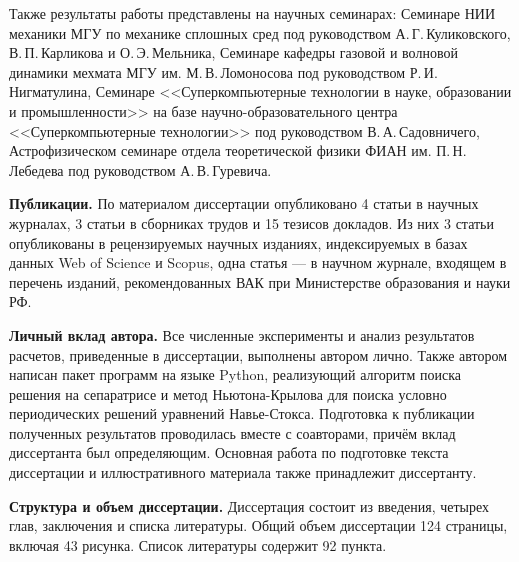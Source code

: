 Также результаты работы представлены на научных семинарах: 
Семинаре НИИ механики МГУ по механике сплошных сред под руководством А.\,Г.\,Куликовского, В.\,П.\,Карликова и О.\,Э.\,Мельника, 
Семинаре кафедры газовой и волновой динамики мехмата МГУ им. М.\,В.\,Ломоносова под руководством Р.\,И.\,Нигматулина,
Семинаре <<Суперкомпьютерные технологии в науке, образовании и промышленности>> на базе научно-образовательного центра <<Суперкомпьютерные технологии>> под руководством В.\,А.\,Садовничего,
Астрофизическом семинаре отдела теоретической физики ФИАН им. П.\,Н.\,Лебедева под руководством А.\,В.\,Гуревича.



\textbf{Публикации.} 
По материалом диссертации опубликовано 4 статьи в научных журналах, 3 статьи в сборниках трудов и 15 тезисов докладов. Из них 3 статьи опубликованы в рецензируемых научных изданиях, индексируемых в базах данных Web of Science и Scopus, одна статья --- в научном журнале, входящем в перечень изданий, рекомендованных ВАК при Министерстве образования и науки РФ. 

{\bf Личный вклад автора.} 
Все численные эксперименты и анализ результатов расчетов, приведенные в диссертации, выполнены автором лично. Также автором написан пакет программ на языке Python, реализующий алгоритм поиска решения на сепаратрисе и метод Ньютона-Крылова для поиска условно периодических решений уравнений Навье-Стокса. Подготовка к публикации полученных результатов проводилась вместе с соавторами, причём вклад диссертанта был определяющим. Основная работа по подготовке текста диссертации и иллюстративного материала также принадлежит диссертанту. 

{\bf Структура и объем диссертации.} 
Диссертация состоит из введения, четырех глав, заключения и списка литературы. Общий объем диссертации 124 страницы, включая 43 рисунка. Список литературы содержит 92 пункта. 



